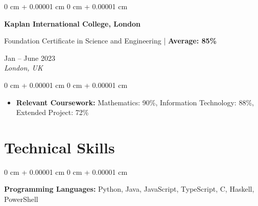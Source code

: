 \documentclass[10pt, a4paper]{article}
\newenvironment{highlights}{
    \begin{itemize}[
        topsep=0.10 cm,
        parsep=0.10 cm,
        partopsep=0pt,
        itemsep=0pt,
        leftmargin=20pt
    ]
}{
    \end{itemize}
} %
\newenvironment{onecolentry}{
    \begin{adjustwidth}{
        0 cm + 0.00001 cm
    }{
        0 cm + 0.00001 cm
    }
}{
    \end{adjustwidth}
} %
\newenvironment{twocolentry}[2][]{
    \onecolentry
    \def\secondColumn{#2}
    \setcolumnwidth{\fill, 4.5 cm}
    \begin{paracol}{2}
}{
    \switchcolumn \raggedleft \secondColumn
    \end{paracol}
    \endonecolentry
} %
\begin{document}
    \vspace{0.2 cm}

    \begin{twocolentry}{
        Jan -- June 2023 \\
        \textit{London, UK}
    }
        \textbf{Kaplan International College, London}

        Foundation Certificate in Science and Engineering | \textbf{Average: 85\%}
    \end{twocolentry}

    \vspace{0.10 cm}
    \begin{onecolentry}
        \begin{highlights}
            \item \textbf{Relevant Coursework:} Mathematics: 90\%, Information Technology: 88\%, Extended Project: 72\%
        \end{highlights}
    \end{onecolentry}




    \section{Technical Skills}

    \begin{onecolentry}
        \textbf{Programming Languages:} Python, Java, JavaScript, TypeScript, C, Haskell, PowerShell
    \end{onecolentry}

    \vspace{0.2 cm}
\end{document}
